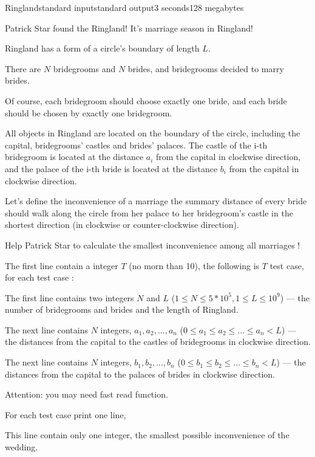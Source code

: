 \begin{problem}{Ringland}{standard input}{standard output}{3 seconds}{128 megabytes}

Patrick Star found the Ringland! It's marriage season in Ringland!

Ringland has a form of a circle's boundary of length $L$.

There are $N$ bridegrooms and $N$ brides, and bridegrooms decided to marry brides.

Of course, each bridegroom should choose exactly one bride, and each bride should be chosen by exactly one bridegroom.

All objects in Ringland are located on the boundary of the circle, including the capital, bridegrooms' castles and brides' palaces. The castle of the i-th bridegroom is located at the distance $a_i$ from the capital in clockwise direction, and the palace of the i-th bride is located at the distance $b_i$ from the capital in clockwise direction.

Let's define the inconvenience of a marriage the summary distance of every bride should walk along the circle from her palace to her bridegroom's castle in the shortest direction (in clockwise or counter-clockwise direction).

Help Patrick Star to calculate the smallest inconvenience among all marriages !

\InputFile
The first line contain a integer $T$ (no morn than 10), the following is $T$ test case, for each test case :

The first line contains two integers $N$ and $L$ ($1 \le N \le 5 * 10^5, 1\le L \le 10^9$) --- the number of bridegrooms and brides and the length of Ringland.

The next line contains $N$ integers, $a_1, a_2, ..., a_n$ ($0 \le a_1 \le a_2 \le ... \le a_n < L$) --- the distances from the capital to the castles of bridegrooms in clockwise direction.

The next line contains $N$ integers, $b_1, b_2, ..., b_n$ ($0 \le b_1 \le b_2 \le ... \le b_n < L$) --- the distances from the capital to the palaces of brides in clockwise direction.

Attention: you may need fast read function.

\OutputFile
For each test case print one line,

This line contain only one integer, the smallest possible inconvenience of the wedding.

\Example

\begin{example}
%
\end{example}

\end{problem}

